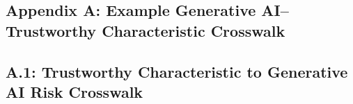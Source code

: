\documentclass[fleqn]{article}
\begin{document}
\begin{landscape}
\thispagestyle{empty}	
\section*{Appendix A: Example Generative AI--Trustworthy Characteristic Crosswalk}\label{sec:appndxa}


\subsection{A.1: Trustworthy Characteristic to Generative AI Risk Crosswalk}\label{sec:appndxa1}


\end{landscape}
\end{document}
